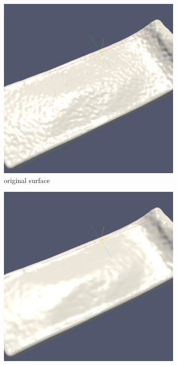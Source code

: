 \begin{figure}
	\begin{center}
		\begin{subfigure}[b]{0.47\textwidth}
			\includegraphics[width=\textwidth]{figures/MLS2SurfaceOriginal.png}
			\caption{original surface}
		\end{subfigure}
		\begin{subfigure}[b]{0.47\textwidth}
			\includegraphics[width=\textwidth]{figures/Mls2Surface1Iteration.png}

\end{subfigure}
\end{center}
\end{figure}

